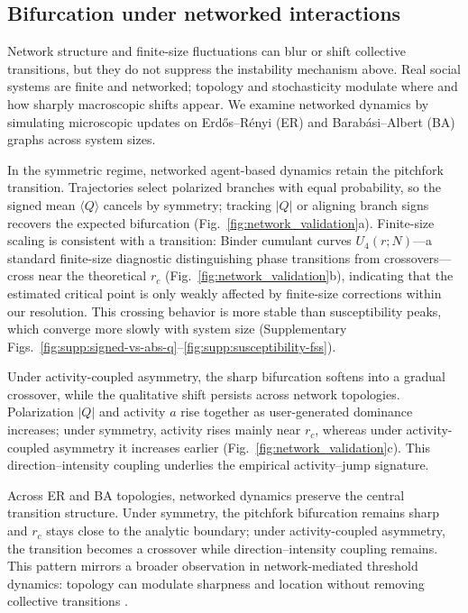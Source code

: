 \documentclass[11pt]{article}
\begin{document}
\subsection{Bifurcation under networked interactions}
\label{sec:network-validation}
Network structure and finite-size fluctuations can blur or shift collective transitions, but they do not suppress the instability mechanism above. Real social systems are finite and networked; topology and stochasticity modulate where and how sharply macroscopic shifts appear. We examine networked dynamics by simulating microscopic updates on Erd\H{o}s--R\'enyi (ER) and Barab\'asi--Albert (BA) graphs across system sizes.

In the symmetric regime, networked agent-based dynamics retain the pitchfork transition. Trajectories select polarized branches with equal probability, so the signed mean $\langle Q\rangle$ cancels by symmetry; tracking $|Q|$ or aligning branch signs recovers the expected bifurcation (Fig.~\ref{fig:network_validation}a). Finite-size scaling is consistent with a transition: Binder cumulant curves $U_4(r;N)$---a standard finite-size diagnostic distinguishing phase transitions from crossovers---cross near the theoretical $r_c$ (Fig.~\ref{fig:network_validation}b), indicating that the estimated critical point is only weakly affected by finite-size corrections within our resolution. This crossing behavior is more stable than susceptibility peaks, which converge more slowly with system size (Supplementary Figs.~\ref{fig:supp:signed-vs-abs-q}--\ref{fig:supp:susceptibility-fss}).

Under activity-coupled asymmetry, the sharp bifurcation softens into a gradual crossover, while the qualitative shift persists across network topologies. Polarization $|Q|$ and activity $a$ rise together as user-generated dominance increases; under symmetry, activity rises mainly near $r_c$, whereas under activity-coupled asymmetry it increases earlier (Fig.~\ref{fig:network_validation}c). This direction--intensity coupling underlies the empirical activity--jump signature.

Across ER and BA topologies, networked dynamics preserve the central transition structure. Under symmetry, the pitchfork bifurcation remains sharp and $r_c$ stays close to the analytic boundary; under activity-coupled asymmetry, the transition becomes a crossover while direction--intensity coupling remains. This pattern mirrors a broader observation in network-mediated threshold dynamics: topology can modulate sharpness and location without removing collective transitions \citep{Watts2002,Centola2010,Centola2018Tipping,Iacopini2019}.
\end{document}
